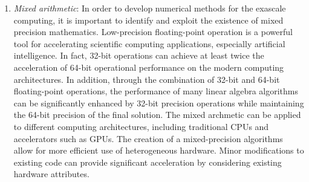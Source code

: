 {\begin{enumerate}[label=(\arabic*)]
	
	\item \textit{Mixed arithmetic}: In order to develop numerical methods for the exascale computing, it is important to identify and exploit the existence of mixed precision mathematics. Low-precision floating-point operation is a powerful tool for accelerating scientific computing applications, especially artificial intelligence. In fact, 32-bit operations can achieve at least twice the acceleration of 64-bit operational performance on the modern computing architectures. In addition, through the combination of 32-bit and 64-bit floating-point operations, the performance of many linear algebra algorithms can be significantly enhanced by 32-bit precision operations while maintaining the 64-bit precision of the final solution. The mixed archmetic can be applied to different computing architectures, including traditional CPUs and accelerators such as GPUs. The creation of a mixed-precision algorithms allow for more efficient use of heterogeneous hardware. Minor modifications to existing code can provide significant acceleration by considering existing hardware attributes.
	

\end{enumerate}}
